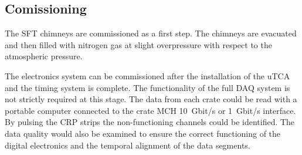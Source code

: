 

\subsection{Comissioning}
\label{sec:fddp-tpc-elec-comission}

The SFT chimneys are commissioned as a first step. The chimneys are evacuated and then filled with nitrogen gas at slight overpressure with respect to the atmospheric pressure.

The electronics system can be commissioned after the installation of the uTCA and the timing system is complete. The functionality of the full DAQ system is not strictly required at this stage. The data from each crate could be read with a portable computer connected to the crate MCH \SI{10}{Gbit/s} or \SI{1}{Gbit/s} interface. By pulsing the CRP strips the non-functioning channels could be identified. The data quality would also be examined to ensure the correct functioning of the digital electronics and the temporal alignment of the data segments.   






